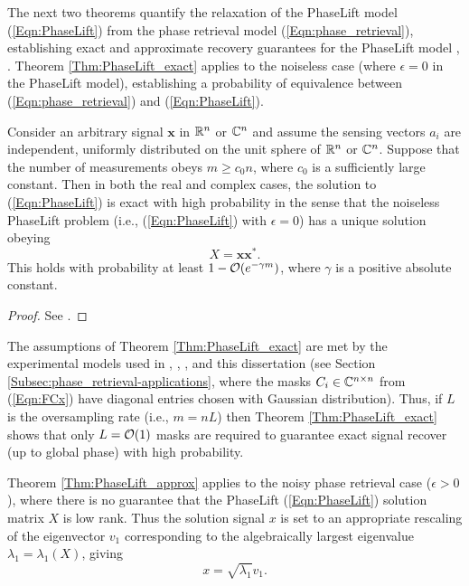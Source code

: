 The next two theorems quantify the relaxation of the PhaseLift model (\ref{Eqn:PhaseLift}) from the phase retrieval model (\ref{Eqn:phase_retrieval}), establishing exact and approximate recovery guarantees for the PhaseLift model \cite{candes2014solving}, \cite{candes2013phaselift}.  Theorem \ref{Thm:PhaseLift_exact} applies to the noiseless case (where $\epsilon = 0$ in the PhaseLift model), establishing a probability of equivalence between (\ref{Eqn:phase_retrieval}) and (\ref{Eqn:PhaseLift}).  


\begin{theorem}  \label{Thm:PhaseLift_exact}
Consider an arbitrary signal $\mathbf{x}$ in ${\mathbb R}^n$ or ${\mathbb C}^n$ and assume the sensing vectors $a_i$ are independent, uniformly distributed on the unit sphere of ${\mathbb R}^n$ or ${\mathbb C}^n$.  Suppose that the number of measurements obeys $m \geq c_0 n$, where $c_0$ is a sufficiently large constant. Then in both the real and complex cases, the solution to (\ref{Eqn:PhaseLift}) is exact with high probability in the sense that the noiseless PhaseLift problem (i.e., (\ref{Eqn:PhaseLift}) with $\epsilon = 0$) has a unique solution obeying
\[
X = \mathbf{x}\mathbf{x}^*.
\]
This holds with probability at least $1 - {\mathcal O}(e^{-\gamma m})$, where $\gamma$ is a positive absolute constant.
\end{theorem}
\begin{proof}
See \cite[Section 2]{candes2014solving}.
\end{proof}




The assumptions of Theorem \ref{Thm:PhaseLift_exact} are met by the experimental models used in \cite{DBLP:journals/siamis/CandesESV13}, \cite{candes2013phaselift}, \cite{DBLP:journals/siamsc/FriedlanderM16}, and this dissertation (see Section \ref{Subsec:phase_retrieval-applications}, where the masks $C_i \in {\mathbb C}^{n \times n}$ from (\ref{Eqn:FCx}) have diagonal entries chosen with Gaussian distribution).  Thus, if $L$ is the oversampling rate (i.e., $m = nL$) then Theorem \ref{Thm:PhaseLift_exact} shows that only $L = {\mathcal O}(1)$ masks are required to guarantee exact signal recover (up to global phase) with high probability.




Theorem \ref{Thm:PhaseLift_approx} applies to the  noisy phase retrieval case ($\epsilon > 0$), where there is no guarantee that the PhaseLift (\ref{Eqn:PhaseLift}) solution matrix $X$ is low rank.  Thus the solution signal $x$ is set to an appropriate rescaling of the eigenvector $v_1$ corresponding to the algebraically largest eigenvalue $\lambda_1 = \lambda_1 (X)$, giving
\begin{equation}  			\label{Eqn:PhaseLift_solution_signal}
x = \sqrt{\lambda_1}v_1.
\end{equation}

